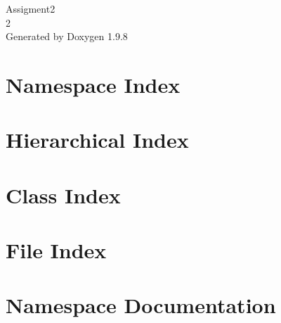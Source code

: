 \documentclass[twoside]{book}
\newcommand{\+}{\discretionary{\mbox{\scriptsize$\hookleftarrow$}}{}{}}
\newcommand{\clearemptydoublepage}{%
    \newpage{\pagestyle{empty}\cleardoublepage}%
  }
\begin{document}
  \raggedbottom
    \hypersetup{pageanchor=false,
                bookmarksnumbered=true,
                pdfencoding=unicode
               }
  \begin{titlepage}
  \vspace*{7cm}
  \begin{center}%
  {\Large Assigment2}\\
  [1ex]\large 2 \\
  \vspace*{1cm}
  {\large Generated by Doxygen 1.9.8}\\
  \end{center}
  \end{titlepage}
  \clearemptydoublepage
  \tableofcontents
  \clearemptydoublepage
  \hypersetup{pageanchor=true}



\chapter{Namespace Index}

\chapter{Hierarchical Index}

\chapter{Class Index}

\chapter{File Index}

\chapter{Namespace Documentation}



























\end{document}

